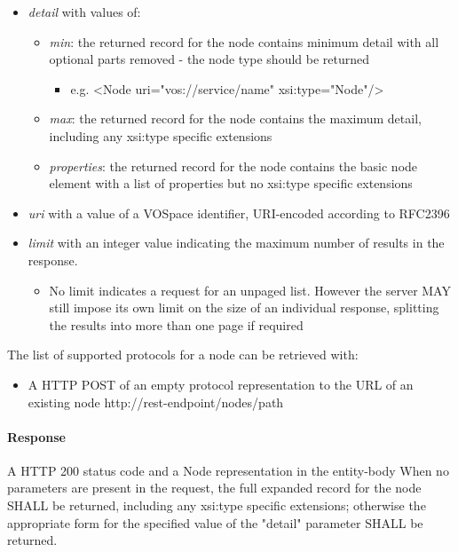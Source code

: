 \documentclass[11pt,a4paper]{ivoa}
\begin{document}
\begin{itemize}
    \item \emph{detail} with values of:
    \begin{itemize}
        \item \emph{min}: the returned record for the node contains minimum detail with all optional parts removed - the node type should be returned
        \begin{itemize}
            \item e.g. <Node uri="vos://service/name" xsi:type="Node"/>
        \end{itemize}
        \item \emph{max}: the returned record for the node contains the maximum detail, including any xsi:type specific extensions
        \item \emph{properties}: the returned record for the node contains the basic node element with a list of properties but no xsi:type specific extensions
    \end{itemize}
    \item \emph{uri} with a value of a VOSpace identifier, URI-encoded according to RFC2396
    \item \emph{limit} with an integer value indicating the maximum number of results in the response.
    \begin{itemize}
        \item No limit indicates a request for an unpaged list. However the server MAY still impose its own limit on the size of an individual response, splitting the results into more than one page if required
     \end{itemize}
\end{itemize}
The list of supported protocols for a node can be retrieved with:

\begin{itemize}
    \item A HTTP POST of an empty protocol representation to the URL of an existing node http://rest-endpoint/nodes/path
\end{itemize}
    
\paragraph{Response}
A HTTP 200 status code and a Node representation in the entity-body
When no parameters are present in the request, the full expanded record for the node SHALL be returned, including any xsi:type specific extensions; otherwise the appropriate form for the specified value of the "detail" parameter SHALL be returned.
\end{document}
